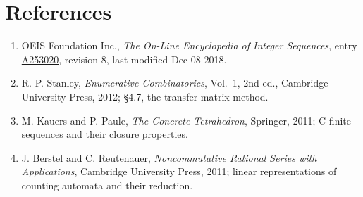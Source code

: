\documentclass[11pt]{article}
\theoremstyle{definition}
\begin{document}
\section{References}

\begin{enumerate}

\item OEIS Foundation Inc., \emph{The On-Line Encyclopedia of Integer Sequences}, entry \href{https://oeis.org/A253020}{A253020}, revision 8, last modified Dec 08 2018.

\item R. P. Stanley, \emph{Enumerative Combinatorics}, Vol.~1, 2nd ed., Cambridge University Press, 2012; \S4.7, the transfer-matrix method.

\item M. Kauers and P. Paule, \emph{The Concrete Tetrahedron}, Springer, 2011; C-finite sequences and their closure properties.

\item J. Berstel and C. Reutenauer, \emph{Noncommutative Rational Series with Applications}, Cambridge University Press, 2011; linear representations of counting automata and their reduction.

\end{enumerate}
\end{document}
